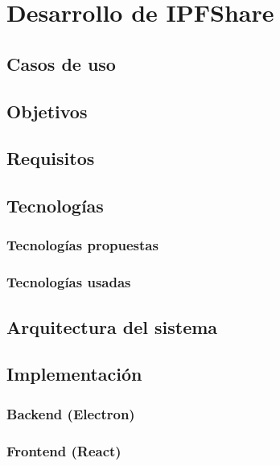 \chapter{Desarrollo de IPFShare}

\section{Casos de uso}


\section{Objetivos}


\section{Requisitos}


\section{Tecnologías}
\subsection{Tecnologías propuestas}
\subsection{Tecnologías usadas}
\section{Arquitectura del sistema}

\label{sec:arquitectura_del_sistema}

\section{Implementación}

\subsection{Backend (Electron)}
\subsection{Frontend (React)}
